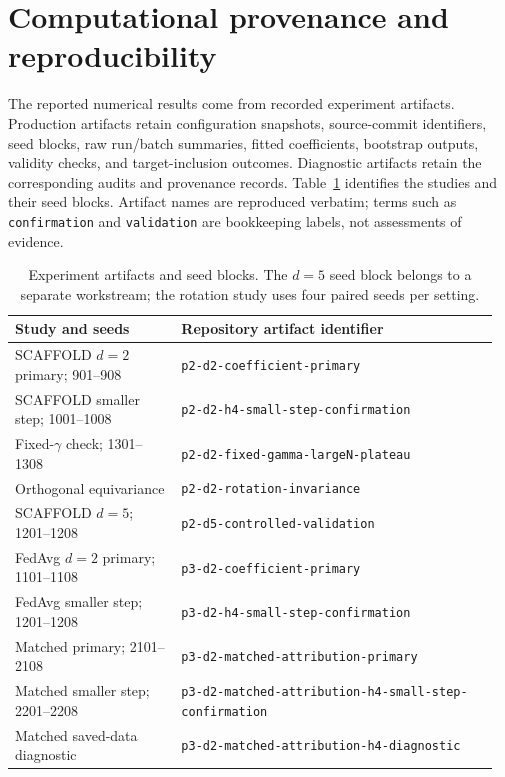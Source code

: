\clearpage
\section{Computational provenance and reproducibility}
\label{app:reproducibility}

The reported numerical results come from recorded experiment artifacts.
Production artifacts retain configuration snapshots, source-commit identifiers,
seed blocks, raw run/batch summaries, fitted coefficients, bootstrap outputs,
validity checks, and target-inclusion outcomes. Diagnostic artifacts retain
the corresponding audits and provenance records.
Table~\ref{tab:F-artifacts} identifies the studies and their seed blocks.
Artifact names are reproduced verbatim; terms such as \texttt{confirmation}
and \texttt{validation} are bookkeeping labels, not assessments of evidence.

\begin{table}[htbp]
\centering\small
\caption{Experiment artifacts and seed blocks. The $d=5$ seed block belongs
to a separate workstream; the rotation study uses four paired seeds per setting.}
\label{tab:F-artifacts}
\begin{tabular}{@{}p{0.33\linewidth}p{0.63\linewidth}@{}}
\toprule
Study and seeds & Repository artifact identifier \\
\midrule
SCAFFOLD $d=2$ primary; 901--908 &
\nolinkurl{p2-d2-coefficient-primary} \\
SCAFFOLD smaller step; 1001--1008 &
\nolinkurl{p2-d2-h4-small-step-confirmation} \\
Fixed-$\gamma$ check; 1301--1308 &
\nolinkurl{p2-d2-fixed-gamma-largeN-plateau} \\
Orthogonal equivariance &
\nolinkurl{p2-d2-rotation-invariance} \\
SCAFFOLD $d=5$; 1201--1208 &
\nolinkurl{p2-d5-controlled-validation} \\
FedAvg $d=2$ primary; 1101--1108 &
\nolinkurl{p3-d2-coefficient-primary} \\
FedAvg smaller step; 1201--1208 &
\nolinkurl{p3-d2-h4-small-step-confirmation} \\
Matched primary; 2101--2108 &
\nolinkurl{p3-d2-matched-attribution-primary} \\
Matched smaller step; 2201--2208 &
\nolinkurl{p3-d2-matched-attribution-h4-small-step-confirmation} \\
Matched saved-data diagnostic &
\nolinkurl{p3-d2-matched-attribution-h4-diagnostic} \\
\bottomrule
\end{tabular}
\end{table}

